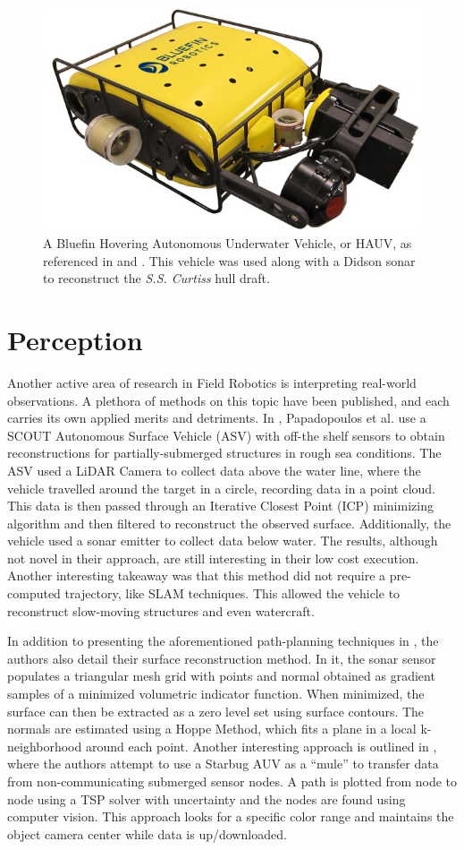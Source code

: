 \documentclass[double,12pt]{beavtex}
\begin{document}
\begin{figure}[h!]
\begin{center}
\includegraphics[width=0.5\columnwidth]{hauv}
\caption{A Bluefin Hovering Autonomous Underwater Vehicle, or HAUV, as referenced in \cite{kim} and \cite{hover}. This vehicle was used along with a Didson sonar to reconstruct the \textit{S.S. Curtiss} hull draft.}
\label{fig:hauv}
\end{center}
\end{figure}

\section{Perception}
Another active area of research in Field Robotics is interpreting real-world observations. A plethora of methods on this topic have been published, and each carries its own applied merits and detriments. In \cite{papa}, Papadopoulos et al. use a SCOUT Autonomous Surface Vehicle (ASV) with off-the shelf sensors to obtain reconstructions for partially-submerged structures in rough sea conditions. The ASV used a LiDAR Camera to collect data above the water line, where the vehicle travelled around the target in a circle, recording data in a point cloud. This data is then passed through an Iterative Closest Point (ICP) minimizing algorithm and then filtered to reconstruct the observed surface. Additionally, the vehicle used a sonar emitter to collect data below water. The results, although not novel in their approach, are still interesting in their low cost execution. Another interesting takeaway was that this method did not require a pre-computed trajectory, like SLAM techniques. This allowed the vehicle to reconstruct slow-moving structures and even watercraft. 

In addition to presenting the aforementioned path-planning techniques in \cite{galceran}, the authors also detail their surface reconstruction method. In it, the sonar sensor populates a triangular mesh grid with points and normal obtained as gradient samples of a minimized volumetric indicator function. When minimized, the surface can then be extracted as a zero level set using surface contours. The normals are estimated using a Hoppe Method, which fits a plane in a local k-neighborhood around each point. Another interesting approach is outlined in \cite{dunbabin}, where the authors attempt to use a Starbug AUV as a “mule” to transfer data from non-communicating submerged sensor nodes. A path is plotted from node to node using a TSP solver with uncertainty and the nodes are found using computer vision. This approach looks for a specific color range and maintains the object camera center while data is up/downloaded. 
\end{document}
